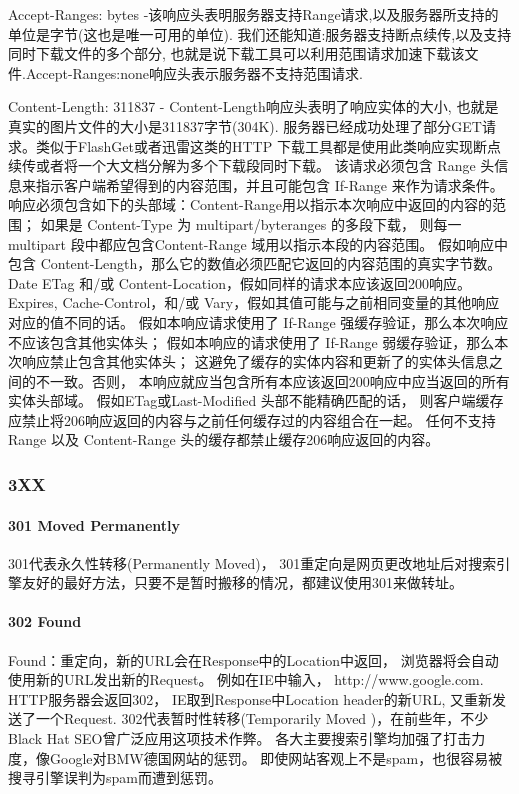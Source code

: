 \documentclass{book}
\begin{document}
Accept-Ranges: bytes -该响应头表明服务器支持Range请求,以及服务器所支持的单位是字节(这也是唯一可用的单位).
我们还能知道:服务器支持断点续传,以及支持同时下载文件的多个部分,
也就是说下载工具可以利用范围请求加速下载该文件.Accept-Ranges:none响应头表示服务器不支持范围请求.

Content-Length: 311837 - Content-Length响应头表明了响应实体的大小,
也就是真实的图片文件的大小是311837字节(304K).
服务器已经成功处理了部分GET请求。类似于FlashGet或者迅雷这类的HTTP
下载工具都是使用此类响应实现断点续传或者将一个大文档分解为多个下载段同时下载。
该请求必须包含 Range 头信息来指示客户端希望得到的内容范围，并且可能包含 If-Range
来作为请求条件。响应必须包含如下的头部域：Content-Range用以指示本次响应中返回的内容的范围；
如果是 Content-Type 为 multipart/byteranges 的多段下载，
则每一 multipart 段中都应包含Content-Range 域用以指示本段的内容范围。
假如响应中包含 Content-Length，那么它的数值必须匹配它返回的内容范围的真实字节数。
Date ETag 和/或 Content-Location，假如同样的请求本应该返回200响应。
Expires, Cache-Control，和/或 Vary，假如其值可能与之前相同变量的其他响应对应的值不同的话。
假如本响应请求使用了 If-Range 强缓存验证，那么本次响应不应该包含其他实体头；
假如本响应的请求使用了 If-Range 弱缓存验证，那么本次响应禁止包含其他实体头；
这避免了缓存的实体内容和更新了的实体头信息之间的不一致。否则，
本响应就应当包含所有本应该返回200响应中应当返回的所有实体头部域。
假如ETag或Last-Modified 头部不能精确匹配的话，
则客户端缓存应禁止将206响应返回的内容与之前任何缓存过的内容组合在一起。
任何不支持 Range 以及 Content-Range 头的缓存都禁止缓存206响应返回的内容。



\subsubsection{3XX}

\paragraph{301 Moved Permanently}301代表永久性转移(Permanently Moved)，
301重定向是网页更改地址后对搜索引擎友好的最好方法，只要不是暂时搬移的情况，都建议使用301来做转址。

\paragraph{302 Found} Found：重定向，新的URL会在Response中的Location中返回，
浏览器将会自动使用新的URL发出新的Request。
例如在IE中输入， http://www.google.com. HTTP服务器会返回302， 
IE取到Response中Location header的新URL, 又重新发送了一个Request.
302代表暂时性转移(Temporarily Moved )，在前些年，不少Black Hat SEO曾广泛应用这项技术作弊。
各大主要搜索引擎均加强了打击力度，像Google对BMW德国网站的惩罚。
即使网站客观上不是spam，也很容易被搜寻引擎误判为spam而遭到惩罚。
\end{document}
